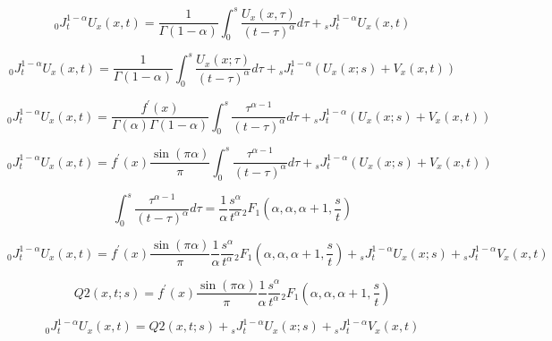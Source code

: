 \documentclass[12pt, a4paper]{article}
\begin{document}
	\begin{equation}
	{}_{0}J^{1-\alpha}_{t}U_{x}(x,t) =  \frac{1}{\Gamma(1-\alpha)} \int_{0}^{s} \frac{U_{x}(x,\tau)}{(t-\tau)^{\alpha}}d\tau + {}_{s}J^{1-\alpha}_{t}U_{x}(x,t)
	\end{equation}
	
	\begin{equation}
	{}_{0}J^{1-\alpha}_{t}U_{x}(x,t) =  \frac{1}{\Gamma(1-\alpha)} \int_{0}^{s} \frac{U_{x}(x;\tau)}{(t-\tau)^{\alpha}}d\tau + {}_{s}J^{1-\alpha}_{t}(U_{x}(x;s) + V_{x}(x,t))
	\end{equation}
	
	\begin{equation}
	{}_{0}J^{1-\alpha}_{t}U_{x}(x,t) =  \frac{f^{'}(x)}{\Gamma(\alpha)\Gamma(1-\alpha)} \int_{0}^{s} \frac{\tau^{\alpha-1}}{(t-\tau)^{\alpha}}d\tau + {}_{s}J^{1-\alpha}_{t}(U_{x}(x;s) + V_{x}(x,t))
	\end{equation}
	
	\begin{equation}
	{}_{0}J^{1-\alpha}_{t}U_{x}(x,t) =  f^{'}(x) \frac{\sin(\pi \alpha)}{\pi} \int_{0}^{s} \frac{\tau^{\alpha-1}}{(t-\tau)^{\alpha}}d\tau + {}_{s}J^{1-\alpha}_{t}(U_{x}(x;s) + V_{x}(x,t))
	\end{equation}
	
	\begin{equation}
	\int_{0}^{s} \frac{\tau^{\alpha-1}}{(t-\tau)^{\alpha}}d\tau = \frac{1}{\alpha} \frac{s^{\alpha}}{t^{\alpha}} {}_{2}F_{1}\left(\alpha, \alpha, \alpha+1, \frac{s}{t}\right)
	\end{equation}

	\begin{equation}
	{}_{0}J^{1-\alpha}_{t}U_{x}(x,t) =  f^{'}(x) \frac{\sin(\pi \alpha)}{\pi} \frac{1}{\alpha} \frac{s^{\alpha}}{t^{\alpha}} {}_{2}F_{1}\left(\alpha, \alpha, \alpha+1, \frac{s}{t}\right) + {}_{s}J^{1-\alpha}_{t}U_{x}(x;s) +  {}_{s}J^{1-\alpha}_{t}V_{x}(x,t)
	\end{equation}
	
	\begin{equation}
	Q2(x,t;s) =  f^{'}(x) \frac{\sin(\pi \alpha)}{\pi} \frac{1}{\alpha} \frac{s^{\alpha}}{t^{\alpha}} {}_{2}F_{1}\left(\alpha, \alpha, \alpha+1, \frac{s}{t}\right)
	\end{equation}
	
	\begin{equation}
	{}_{0}J^{1-\alpha}_{t}U_{x}(x,t) =  Q2(x,t;s) + {}_{s}J^{1-\alpha}_{t}U_{x}(x;s) +  {}_{s}J^{1-\alpha}_{t}V_{x}(x,t)
	\end{equation}
	
\end{document}

